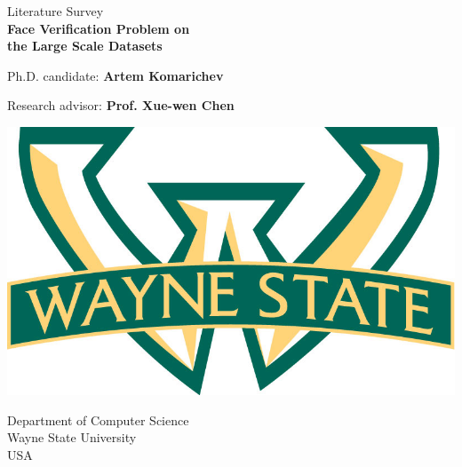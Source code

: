 \documentclass[paper=a4, fontsize=11pt]{scrartcl} %
\numberwithin{equation}{section} %
\numberwithin{figure}{section} %
\numberwithin{table}{section} %
\begin{document}
\begin{titlepage}
    \begin{center}
        \vspace*{1cm}
        \LARGE
        Literature Survey \\
        \vspace{0.5cm}
        \Huge
        \textbf{Face Verification Problem on \\ the Large Scale Datasets}
        
        \vspace{0.5cm}
        \LARGE
        
        \vspace{5.5cm}
        
        Ph.D. candidate: \textbf{Artem Komarichev}
        
        Research advisor: \textbf{Prof. Xue-wen Chen}
        
        \vfill
        
        
        \vspace{0.8cm}
        
        \includegraphics[scale=0.15]{pictures/warrior_banded_logo.jpg}
        
        \Large
        Department of Computer Science\\
        Wayne State University\\
        USA\\
        
    \end{center}
\end{titlepage}

\end{document}

